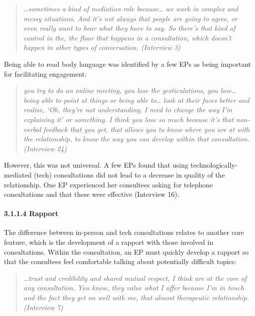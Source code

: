 \documentclass[
]{article}
\begin{document}
\begin{quote}
\emph{\ldots sometimes a kind of mediation role because\ldots{} we work
in complex and messy situations. And it's not always that people are
going to agree, or even really want to hear what they have to say. So
there's that kind of control in the, the floor that happens in a
consultation, which doesn't happen in other types of conversation.
(Interview 3)}
\end{quote}

Being able to read body language was identified by a few EPs as being
important for facilitating engagement:

\begin{quote}
\emph{you try to do an online meeting, you lose the gesticulations, you
lose\ldots{} being able to point at things or being able to\ldots{} look
at their faces better and realise, `Oh, they're not understanding, I
need to change the way I'm explaining it' or something. I think you lose
so much because it's that non-verbal feedback that you get, that allows
you to know where you are at with the relationship, to know the way you
can develop within that consultation. (Interview 24)}
\end{quote}

However, this was not universal. A few EPs found that using
technologically-mediated (tech) consultations did not lead to a decrease
in quality of the relationship. One EP experienced her consultees asking
for telephone consultations and that these were effective (Interview
16).

\hypertarget{rapport}{%
\paragraph{3.1.1.4 Rapport}\label{rapport}}

The difference between in-person and tech consultations relates to
another core feature, which is the development of a rapport with those
involved in consultations. Within the consultation, an EP must quickly
develop a rapport so that the consultees feel comfortable talking about
potentially difficult topics:

\begin{quote}
\emph{\ldots trust and credibility and shared mutual respect, I think
are at the core of any consultation. You know, they value what I offer
because I'm in touch and the fact they get on well with me, that almost
therapeutic relationship. (Interview 7)}
\end{quote}
\end{document}
